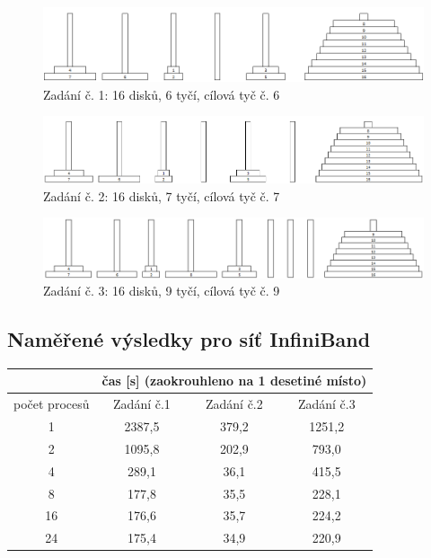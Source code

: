 \documentclass[12pt]{article}
\begin{document}
\begin{figure}[h]
\begin{center}
\includegraphics[width=140mm]{16-6-6.png}
\caption{Zadání č. 1: 16 disků, 6 tyčí, cílová tyč č. 6}
\end{center}
\end{figure}

\begin{figure}[h]
\begin{center}
\includegraphics[width=140mm]{16-7-7.png}
\caption{Zadání č. 2: 16 disků, 7 tyčí, cílová tyč č. 7}
\end{center}
\end{figure}

\begin{figure}[h]
\begin{center}
\includegraphics[width=140mm]{16-9-9.png}
\caption{Zadání č. 3: 16 disků, 9 tyčí, cílová tyč č. 9}
\end{center}
\end{figure}


\subsection{Naměřené výsledky pro síť InfiniBand}
\begin{center}
\begin{tabular}{|c|c|c|c|}
\hline 
 & \multicolumn{3}{c|}{čas [s] (zaokrouhleno na 1 desetiné místo)} \\ 
\hline 
počet procesů & Zadání č.1 & Zadání č.2 & Zadání č.3 \\ 
\hline 
\hline 
1 & 2387,5 & 379,2 & 1251,2 \\ 
\hline 
2 & 1095,8 & 202,9 & 793,0 \\ 
\hline 
4 & 289,1 & 36,1 & 415,5 \\ 
\hline 
8 & 177,8 & 35,5 & 228,1 \\ 
\hline 
16 & 176,6 & 35,7 & 224,2 \\ 
\hline 
24 & 175,4 & 34,9 & 220,9 \\ 
\hline 
\end{tabular} 
\end{center}
\end{document}
